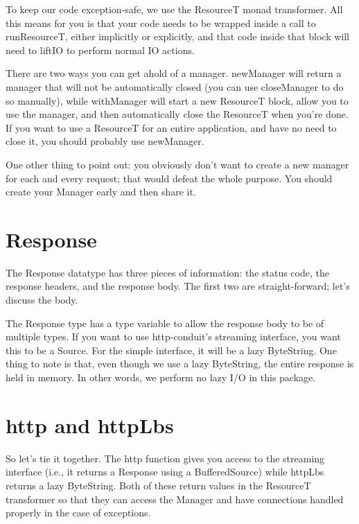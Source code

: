 To keep our code exception-safe, we use the ResourceT monad
transformer. All this means for you is that your code needs to be
wrapped inside a call to runResourceT, either implicitly or
explicitly, and that code inside that block will need to liftIO to
perform normal IO actions.

There are two ways you can get ahold of a manager. newManager will
return a manager that will not be automatically closed (you can use
closeManager to do so manually), while withManager will start a new
ResourceT block, allow you to use the manager, and then automatically
close the ResourceT when you're done. If you want to use a ResourceT
for an entire application, and have no need to close it, you should
probably use newManager.

One other thing to point out: you obviously don't want to create a new
manager for each and every request; that would defeat the whole
purpose. You should create your Manager early and then share it.

\section{Response}

The Response datatype has three pieces of information: the status
code, the response headers, and the response body. The first two are
straight-forward; let's discuss the body.

The Response type has a type variable to allow the response body to be
of multiple types. If you want to use http-conduit's streaming
interface, you want this to be a Source. For the simple interface, it
will be a lazy ByteString. One thing to note is that, even though we
use a lazy ByteString, the entire response is held in memory. In other
words, we perform no lazy I/O in this package.


\section{http and httpLbs}

So let's tie it together. The http function gives you access to the
streaming interface (i.e., it returns a Response using a
BufferedSource) while httpLbs returns a lazy ByteString. Both of these
return values in the ResourceT transformer so that they can access the
Manager and have connections handled properly in the case of
exceptions.

